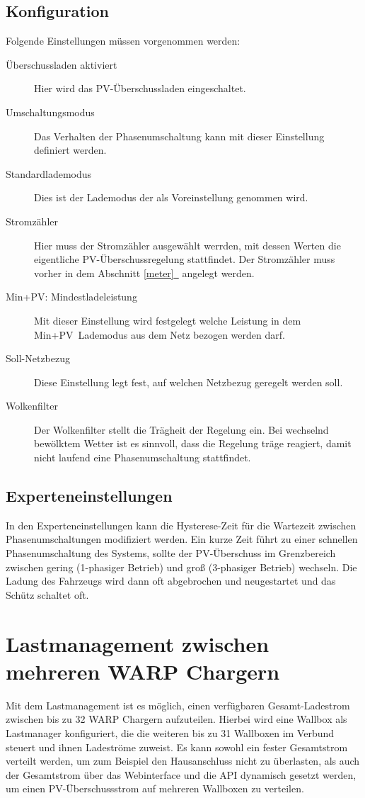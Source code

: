 \documentclass[a4paper,10pt]{article}
\newcommand*{\fullref}[1]{Abschnitt \hyperref[{#1}]{\ref*{#1}~\nameref*{#1}}}
\begin{document}
\begin{multicols*}{2}
	\subsection{Konfiguration}
	Folgende Einstellungen müssen vorgenommen werden:
	\begin{description}
		\item[Überschussladen aktiviert] Hier wird das PV-Überschussladen eingeschaltet.
		\item[Umschaltungsmodus] Das Verhalten der Phasenumschaltung kann mit dieser Einstellung definiert werden.
		\item[Standardlademodus] Dies ist der Lademodus der als Voreinstellung genommen wird.
		\item[Stromzähler] Hier muss der Stromzähler ausgewählt werrden, mit dessen Werten die eigentliche PV-Überschussregelung stattfindet. Der Stromzähler muss vorher in dem \fullref{meter} angelegt werden.
		\item[Min+PV: Mindestladeleistung] Mit dieser Einstellung wird festgelegt welche Leistung in dem \glqq Min+PV\grqq~Lademodus aus dem Netz bezogen werden darf.
		\item[Soll-Netzbezug] Diese Einstellung legt fest, auf welchen
		Netzbezug geregelt werden soll.
		\item[Wolkenfilter] Der Wolkenfilter stellt die Trägheit der Regelung
		ein. Bei wechselnd bewölktem Wetter ist es sinnvoll, dass die Regelung
		träge reagiert, damit nicht laufend eine Phasenumschaltung stattfindet.
	\end{description}


	\subsection{Experteneinstellungen}
	In den Experteneinstellungen kann die Hysterese-Zeit für die
	Wartezeit zwischen Phasenumschaltungen modifiziert werden. Ein kurze Zeit
	führt zu einer schnellen Phasenumschaltung des Systems, sollte der PV-Überschuss
	im Grenzbereich zwischen gering (1-phasiger Betrieb) und groß
	(3-phasiger Betrieb) wechseln. Die Ladung des Fahrzeugs wird dann oft
	abgebrochen und neugestartet und das Schütz schaltet oft.

    \newpage
    \section{Lastmanagement zwischen mehreren WARP Chargern}\label{charge_manager}
    Mit dem Lastmanagement ist es möglich, einen verfügbaren Gesamt-Ladestrom
    zwischen bis zu 32 WARP Chargern aufzuteilen. Hierbei wird eine Wallbox als
    Lastmanager konfiguriert, die die weiteren bis zu 31 Wallboxen im Verbund steuert und ihnen Ladeströme
    zuweist. Es kann sowohl ein fester Gesamtstrom verteilt werden, um zum Beispiel den Hausanschluss nicht zu überlasten,
    als auch der Gesamtstrom über das Webinterface und die API dynamisch gesetzt
	werden, um einen PV-Überschussstrom auf mehreren Wallboxen zu verteilen.


\end{multicols*}
\end{document}
